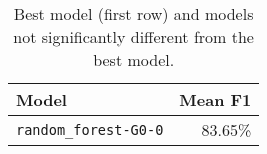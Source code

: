 \begin{table}[H]
\centering
\capstart
\begin{tabularx}{0.48\textwidth}{|X|r|}
\hline
Model & Mean F1 \\
\hline
\texttt{random\_forest-G0-0} & 83.65\% \\
\hline
\end{tabularx}
\caption{Best model (first row) and models not significantly different from the best model.}
\label{tab:best_models}

\end{table}
